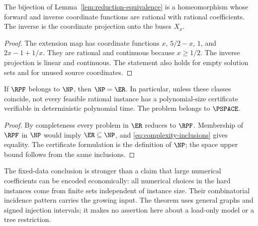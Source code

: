 \begin{proposition}
\label{prop:rational-bijection}
The bijection of Lemma~\ref{lem:reduction-equivalence} is a homeomorphism
whose forward and inverse coordinate functions are rational with rational
coefficients. The inverse is the coordinate projection onto the buses $X_x$.
\end{proposition}
\begin{proof}
The extension map has coordinate functions $x$, $5/2-x$, $1$, and
$2x-1+1/x$. They are rational and continuous because $x\ge1/2$.
The inverse projection is linear and continuous. The statement also holds
for empty solution sets and for unused source coordinates.
\end{proof}

\begin{corollary}
\label{cor:rpf-np}
If $\RPF$ belongs to $\NP$, then $\NP=\ER$. In particular, unless these
classes coincide, not every feasible rational instance has a polynomial-size
certificate verifiable in deterministic polynomial time. The problem belongs
to $\PSPACE$.
\end{corollary}
\begin{proof}
By completeness every problem in $\ER$ reduces to $\RPF$. Membership of
$\RPF$ in $\NP$ would imply $\ER\subseteq\NP$, and
\eqref{eq:complexity-inclusions} gives equality. The certificate formulation
is the definition of $\NP$; the space upper bound follows from the same
inclusions.
\end{proof}

The fixed-data conclusion is stronger than a claim that large numerical
coefficients can be encoded economically: all numerical choices in the
hard instances come from finite sets independent of instance size. Their
combinatorial incidence pattern carries the growing input. The theorem uses
general graphs and signed injection intervals; it makes no assertion here
about a load-only model or a tree restriction.
